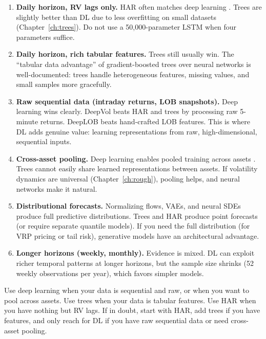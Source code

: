\begin{enumerate}[nosep]
  \item \textbf{Daily horizon, RV lags only.}
    HAR often matches deep learning \citep{ChristensenSiggaardVeliyev2023}.
    Trees are slightly better than DL due to less overfitting on small datasets (Chapter~\ref{ch:trees}).
    Do not use a 50,000-parameter LSTM when four parameters suffice.

  \item \textbf{Daily horizon, rich tabular features.}
    Trees still usually win.
    The ``tabular data advantage'' of gradient-boosted trees over neural networks is well-documented: trees handle heterogeneous features, missing values, and small samples more gracefully.

  \item \textbf{Raw sequential data (intraday returns, LOB snapshots).}
    Deep learning wins clearly.
    DeepVol \citep{MorenoPinoZohren2022DeepVol} beats HAR and trees by processing raw 5-minute returns.
    DeepLOB \citep{ZhangZohrenRoberts2019DeepLOB} beats hand-crafted LOB features.
    This is where DL adds genuine value: learning representations from raw, high-dimensional, sequential inputs.

  \item \textbf{Cross-asset pooling.}
    Deep learning enables pooled training across assets \citep{SirignanoCont2019}.
    Trees cannot easily share learned representations between assets.
    If volatility dynamics are universal (Chapter~\ref{ch:rough}), pooling helps, and neural networks make it natural.

  \item \textbf{Distributional forecasts.}
    Normalizing flows, VAEs, and neural SDEs produce full predictive distributions.
    Trees and HAR produce point forecasts (or require separate quantile models).
    If you need the full distribution (for VRP pricing or tail risk), generative models have an architectural advantage.

  \item \textbf{Longer horizons (weekly, monthly).}
    Evidence is mixed.
    DL can exploit richer temporal patterns at longer horizons, but the sample size shrinks (52 weekly observations per year), which favors simpler models.
\end{enumerate}

\begin{keyidea}
Use deep learning when your data is sequential and raw, or when you want to pool across assets.
Use trees when your data is tabular features.
Use HAR when you have nothing but RV lags.
If in doubt, start with HAR, add trees if you have features, and only reach for DL if you have raw sequential data or need cross-asset pooling.
\end{keyidea}

